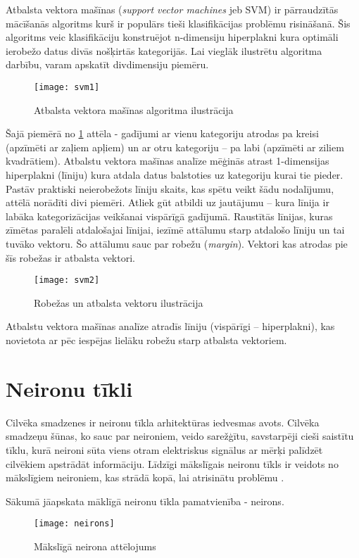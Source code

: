 Atbalsta vektora mašīnas \cite{supportvectornetworks} (\textit{support vector machines} jeb SVM) ir pārraudzītās mācīšanās algoritms kurš ir populārs tieši klasifikācijas problēmu risināšanā. Šis algoritms veic klasifikāciju konstruējot n-dimensiju hiperplakni kura optimāli ierobežo datus divās nošķirtās kategorijās. Lai vieglāk ilustrētu algoritma darbību, varam apskatīt divdimensiju piemēru.
\begin{figure}[H]
	\texttt{[image: svm1]}
	\caption{Atbalsta vektora mašīnas algoritma ilustrācija \cite{supportvectornetworks} }
	\label{fig:svm1}
\end{figure}
Šajā piemērā no \ref{fig:svm1} attēla - gadījumi ar vienu kategoriju atrodas pa kreisi (apzīmēti ar zaļiem apļiem) un ar otru kategoriju – pa labi (apzīmēti ar ziliem kvadrātiem). Atbalstu vektora mašīnas analīze mēģinās atrast 1-dimensijas hiperplakni (līniju) kura atdala datus balstoties uz kategoriju kurai tie pieder. Pastāv praktiski neierobežots līniju skaits, kas spētu veikt šādu nodalījumu, attēlā norādīti divi piemēri. Atliek gūt atbildi uz jautājumu – kura līnija ir labāka kategorizācijas veikšanai vispārīgā gadījumā. Raustītās līnijas, kuras zīmētas paralēli atdalošajai līnijai, iezīmē attālumu starp atdalošo līniju un tai tuvāko vektoru. Šo attālumu sauc par robežu (\textit{margin}). Vektori kas atrodas pie šīs robežas ir atbalsta vektori.
\begin{figure}[H]
	\texttt{[image: svm2]}
	\caption{Robežas un atbalsta vektoru ilustrācija \cite{supportvectornetworks} }
	\label{fig:svm2}
\end{figure}
Atbalstu vektora mašīnas analīze atradīs līniju (vispārīgi – hiperplakni), kas novietota ar pēc iespējas lielāku robežu starp atbalsta vektoriem.

\section{Neironu tīkli}
Cilvēka smadzenes ir neironu tīkla arhitektūras iedvesmas avots. Cilvēka smadzeņu šūnas, ko sauc par neironiem, veido sarežģītu, savstarpēji cieši saistītu tīklu, kurā neironi sūta viens otram elektriskus signālus ar mērķi palīdzēt cilvēkiem apstrādāt informāciju. Līdzīgi mākslīgais neironu tīkls ir veidots no mākslīgiem neironiem, kas strādā kopā, lai atrisinātu problēmu \cite{AwsNeuralNetworks}. 

Sākumā jāapskata māklīgā neironu tīkla pamatvienība - neirons.
\begin{figure}[H]
	\texttt{[image: neirons]}
	\caption{Mākslīgā neirona attēlojums}
	\label{fig:neirons}
\end{figure}

